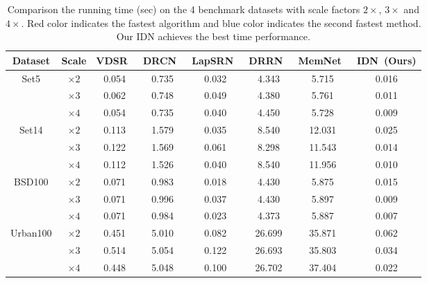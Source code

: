 \documentclass[10pt,twocolumn,letterpaper]{article}
\begin{document}
\begin{table*}[htb]
	\small
	\centering
	\begin{tabular}{|c|c|c|c|c|c|c||c|}
		\hline
		Dataset & Scale & VDSR~\cite{VDSR} & DRCN~\cite{DRCN} & LapSRN~\cite{LapSRN} & DRRN~\cite{DRRN} & MemNet~\cite{MemNet} & IDN~(Ours) \\
		\hline
		\hline
		\multirow{3}{*}{Set5} & $\times 2$ & 0.054 & 0.735 & \textcolor[rgb]{0.00,0.07,1.00}{0.032} & 4.343 & 5.715 & \textcolor[rgb]{1.00,0.00,0.00}{0.016} \\
		& $\times 3$ & 0.062 & 0.748 & \textcolor[rgb]{0.00,0.07,1.00}{0.049} & 4.380 & 5.761 & \textcolor[rgb]{1.00,0.00,0.00}{0.011} \\
		& $\times 4$ & 0.054 & 0.735 & \textcolor[rgb]{0.00,0.07,1.00}{0.040} & 4.450 & 5.728 & \textcolor[rgb]{1.00,0.00,0.00}{0.009} \\
		\hline
		\hline
		\multirow{3}{*}{Set14} & $\times 2$ & 0.113 & 1.579 & \textcolor[rgb]{0.00,0.07,1.00}{0.035} & 8.540 & 12.031 & \textcolor[rgb]{1.00,0.00,0.00}{0.025} \\
		& $\times 3$ & 0.122 & 1.569 & \textcolor[rgb]{0.00,0.07,1.00}{0.061} & 8.298 & 11.543 & \textcolor[rgb]{1.00,0.00,0.00}{0.014} \\
		
		& $\times 4$ & 0.112 & 1.526 & \textcolor[rgb]{0.00,0.07,1.00}{0.040} & 8.540 & 11.956 & \textcolor[rgb]{1.00,0.00,0.00}{0.010} \\
		\hline
		\hline
		\multirow{3}{*}{BSD100} & $\times 2$ & 0.071 & 0.983 & \textcolor[rgb]{0.00,0.07,1.00}{0.018} & 4.430 & 5.875 & \textcolor[rgb]{1.00,0.00,0.00}{0.015} \\
		& $\times 3$ & 0.071 & 0.996 & \textcolor[rgb]{0.00,0.07,1.00}{0.037} & 4.430 & 5.897 & \textcolor[rgb]{1.00,0.00,0.00}{0.009} \\
		& $\times 4$ & 0.071 & 0.984 & \textcolor[rgb]{0.00,0.07,1.00}{0.023} & 4.373 & 5.887 & \textcolor[rgb]{1.00,0.00,0.00}{0.007} \\
		\hline
		\hline
		\multirow{3}{*}{Urban100} & $\times 2$ & 0.451 & 5.010 & \textcolor[rgb]{0.00,0.07,1.00}{0.082} & 26.699 & 35.871 & \textcolor[rgb]{1.00,0.00,0.00}{0.062} \\
		& $\times 3$ & 0.514 & 5.054 & \textcolor[rgb]{0.00,0.07,1.00}{0.122} & 26.693 & 35.803 & \textcolor[rgb]{1.00,0.00,0.00}{0.034} \\
		
		& $\times 4$ & 0.448 & 5.048 & \textcolor[rgb]{0.00,0.07,1.00}{0.100} & 26.702 & 37.404 & \textcolor[rgb]{1.00,0.00,0.00}{0.022} \\
		
		\hline
	\end{tabular}
	\caption{Comparison the running time (sec) on the 4 benchmark datasets with scale factors $2 \times$, $3 \times$ and $4 \times$. Red color indicates the fastest algorithm and blue color indicates the second fastest method. Our IDN achieves the best time performance.}
	\label{tab:time}
\end{table*}
\end{document}
